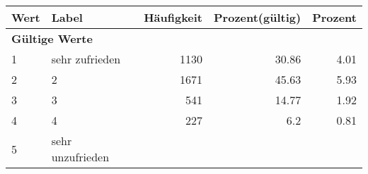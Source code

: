      \begin{longtable}{lXrrr}
     \toprule
     \textbf{Wert} & \textbf{Label} & \textbf{Häufigkeit} & \textbf{Prozent(gültig)} & \textbf{Prozent} \\
     \endhead
     \midrule
     \multicolumn{5}{l}{\textbf{Gültige Werte}}\\

     1 &
     \multicolumn{1}{X}{ sehr zufrieden   } &


       \num{1130} &
       \num[round-mode=places,round-precision=2]{30.86} &
         \num[round-mode=places,round-precision=2]{4.01} \\

     2 &
     \multicolumn{1}{X}{ 2   } &


       \num{1671} &
       \num[round-mode=places,round-precision=2]{45.63} &
         \num[round-mode=places,round-precision=2]{5.93} \\

     3 &
     \multicolumn{1}{X}{ 3   } &


       \num{541} &
       \num[round-mode=places,round-precision=2]{14.77} &
         \num[round-mode=places,round-precision=2]{1.92} \\

     4 &
     \multicolumn{1}{X}{ 4   } &


       \num{227} &
       \num[round-mode=places,round-precision=2]{6.2} &
         \num[round-mode=places,round-precision=2]{0.81} \\

     5 &
     \multicolumn{1}{X}{ sehr unzufrieden   } &



\end{longtable}
